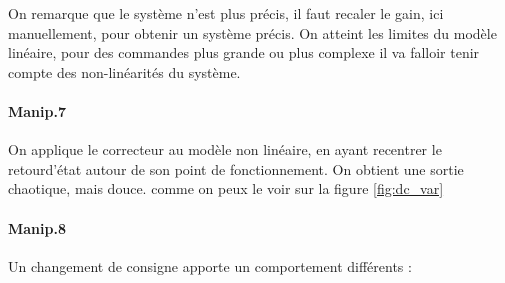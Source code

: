 \documentclass[10pt,a4paper,notitlepage]{article}
\begin{document}
On remarque que le système n'est plus précis, il faut recaler le gain, ici manuellement, pour obtenir un système précis.
On atteint les limites du modèle linéaire, pour des commandes plus grande ou plus complexe il va falloir tenir compte des non-linéarités du système.

\paragraph{Manip.7}
On applique le correcteur au modèle non linéaire, en ayant recentrer le
retourd'état autour de son point de fonctionnement.
On obtient une sortie chaotique, mais douce. comme on peux le voir sur la figure \ref{fig:dc_var} 
\paragraph{Manip.8}
Un changement de consigne apporte un comportement différents :
\end{document}
